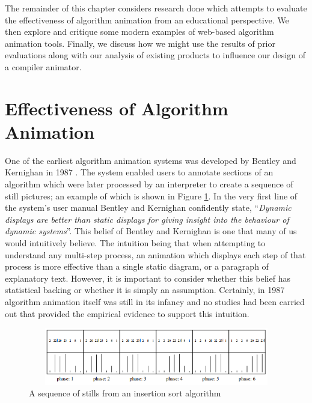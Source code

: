 \documentclass{l4proj}
\begin{document}
The remainder of this chapter considers research done which attempts to evaluate the effectiveness of algorithm animation from an educational perspective. We then explore and critique some modern examples of web-based algorithm animation tools. Finally, we discuss how we might use the results of prior evaluations along with our analysis of existing products to influence our design of a compiler animator.

\section{Effectiveness of Algorithm Animation}
One of the earliest algorithm animation systems was developed by Bentley and Kernighan in 1987 \cite{BentleyKernighan}. The system enabled users to annotate sections of an algorithm which were later processed by an interpreter to create a sequence of still pictures; an example of which is shown in Figure \ref{fig:bentley-kernighan}. In the very first line of the system's user manual Bentley and Kernighan confidently state, ``\textit{Dynamic displays are better than static displays for giving insight into the behaviour of dynamic systems}''. This belief of Bentley and Kernighan is one that many of us would intuitively believe. The intuition being that when attempting to understand any multi-step process, an animation which displays each step of that process is more effective than a single static diagram, or a paragraph of explanatory text. However, it is important to consider whether this belief has statistical backing or whether it is simply an assumption. Certainly, in 1987 algorithm animation itself was still in its infancy and no studies had been carried out that provided the empirical evidence to support this intuition. 

\begin{figure}
\centering
\includegraphics[height=2.5cm,width=13cm]{images/bentleykernighan.png}
\caption{A sequence of stills from an insertion sort algorithm}
\label{fig:bentley-kernighan}	
\end{figure}
\end{document}
